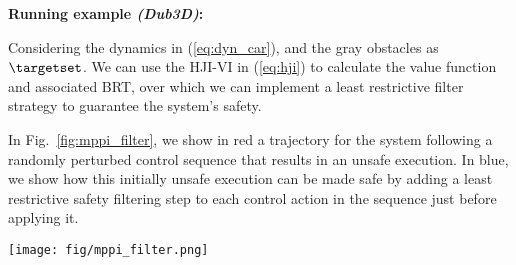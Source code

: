 \begin{mdframed}[style=MyFrame,nobreak=false]

\textbf{Running example \textit{(Dub3D)}:}

Considering the dynamics in (\ref{eq:dyn_car}), and the gray obstacles as $\targetset$. We can use the HJI-VI in (\ref{eq:hji}) to calculate the value function and associated BRT, over which we can implement a least restrictive filter strategy to guarantee the system's safety.

In Fig.~\ref{fig:mppi_filter}, we show in red a trajectory for the system following a randomly perturbed control sequence that results in an unsafe execution. In blue, we show how this initially unsafe execution can be made safe by adding a least restrictive safety filtering step to each control action in the sequence just before applying it.

\vspace{0.5em}
{\centering      \texttt{[image: fig/mppi\_filter.png]}
      \label{fig:mppi_filter} 
}

\end{mdframed}










